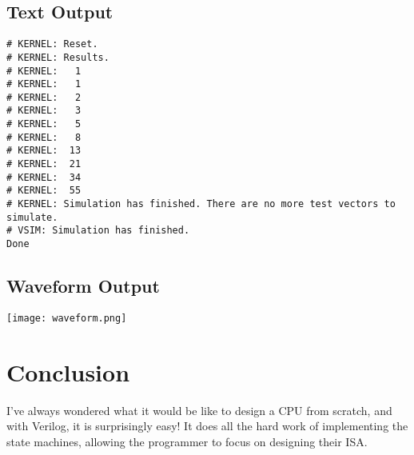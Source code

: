 \documentclass{article}
\begin{document}
\subsection{Text Output}

\begin{lstlisting}
# KERNEL: Reset.
# KERNEL: Results.
# KERNEL:   1
# KERNEL:   1
# KERNEL:   2
# KERNEL:   3
# KERNEL:   5
# KERNEL:   8
# KERNEL:  13
# KERNEL:  21
# KERNEL:  34
# KERNEL:  55
# KERNEL: Simulation has finished. There are no more test vectors to simulate.
# VSIM: Simulation has finished.
Done
\end{lstlisting}

\subsection{Waveform Output}

\texttt{[image: waveform.png]}

\section{Conclusion}

I've always wondered what it would be like to design a CPU from scratch, and with Verilog, it is surprisingly easy! It does all the hard work of implementing the state machines, allowing the programmer to focus on designing their ISA.
\end{document}
